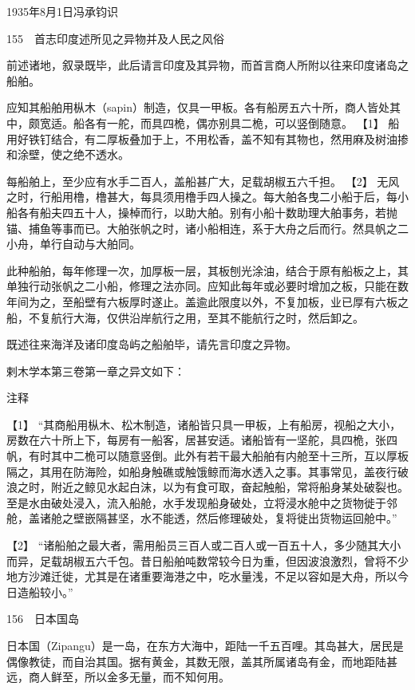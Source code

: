 \documentclass[12pt,UTF8]{ctexbook}
\begin{document}
1935年8月1日冯承钧识





155　首志印度述所见之异物并及人民之风俗

前述诸地，叙录既毕，此后请言印度及其异物，而首言商人所附以往来印度诸岛之船舶。

应知其船舶用枞木（sapin）制造，仅具一甲板。各有船房五六十所，商人皆处其中，颇宽适。船各有一舵，而具四桅，偶亦别具二桅，可以竖倒随意。 【1】 船用好铁钉结合，有二厚板叠加于上，不用松香，盖不知有其物也，然用麻及树油掺和涂壁，使之绝不透水。

每船舶上，至少应有水手二百人，盖船甚广大，足载胡椒五六千担。 【2】 无风之时，行船用橹，橹甚大，每具须用橹手四人操之。每大舶各曳二小船于后，每小船各有船夫四五十人，操棹而行，以助大舶。别有小船十数助理大舶事务，若抛锚、捕鱼等事而已。大舶张帆之时，诸小船相连，系于大舟之后而行。然具帆之二小舟，单行自动与大舶同。

此种船舶，每年修理一次，加厚板一层，其板刨光涂油，结合于原有船板之上，其单独行动张帆之二小船，修理之法亦同。应知此每年或必要时增加之板，只能在数年间为之，至船壁有六板厚时遂止。盖逾此限度以外，不复加板，业已厚有六板之船，不复航行大海，仅供沿岸航行之用，至其不能航行之时，然后卸之。

既述往来海洋及诸印度岛屿之船舶毕，请先言印度之异物。

剌木学本第三卷第一章之异文如下：

注释

【1】 “其商船用枞木、松木制造，诸船皆只具一甲板，上有船房，视船之大小，房数在六十所上下，每房有一船客，居甚安适。诸船皆有一坚舵，具四桅，张四帆，有时其中二桅可以随意竖倒。此外有若干最大船舶有内舱至十三所，互以厚板隔之，其用在防海险，如船身触礁或触饿鲸而海水透入之事。其事常见，盖夜行破浪之时，附近之鲸见水起白沫，以为有食可取，奋起触船，常将船身某处破裂也。至是水由破处浸入，流入船舱，水手发现船身破处，立将浸水舱中之货物徙于邻舱，盖诸舱之壁嵌隔甚坚，水不能透，然后修理破处，复将徙出货物运回舱中。”

【2】 “诸船舶之最大者，需用船员三百人或二百人或一百五十人，多少随其大小而异，足载胡椒五六千包。昔日船舶吨数常较今日为重，但因波浪激烈，曾将不少地方沙滩迁徙，尤其是在诸重要海港之中，吃水量浅，不足以容如是大舟，所以今日造船较小。”





156　日本国岛

日本国（Zipangu）是一岛，在东方大海中，距陆一千五百哩。其岛甚大，居民是偶像教徒，而自治其国。据有黄金，其数无限，盖其所属诸岛有金，而地距陆甚远，商人鲜至，所以金多无量，而不知何用。
\end{document}

